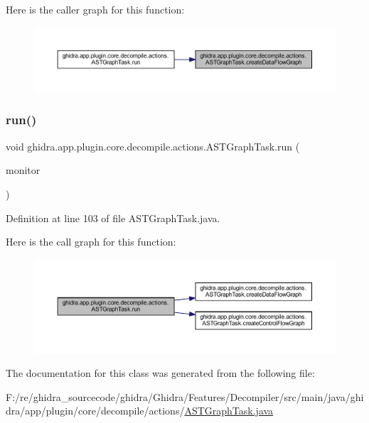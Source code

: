 Here is the caller graph for this function\+:
\nopagebreak
\begin{figure}[H]
\begin{center}
\leavevmode
\includegraphics[width=350pt]{classghidra_1_1app_1_1plugin_1_1core_1_1decompile_1_1actions_1_1_a_s_t_graph_task_a696b176035c13b47e77ed1371f3511f5_icgraph}
\end{center}
\end{figure}
\mbox{\label{classghidra_1_1app_1_1plugin_1_1core_1_1decompile_1_1actions_1_1_a_s_t_graph_task_afed12375602467d717a1d2afe52573ee}} 
\subsubsection{\texorpdfstring{run()}{run()}}
{\footnotesize\ttfamily void ghidra.\+app.\+plugin.\+core.\+decompile.\+actions.\+A\+S\+T\+Graph\+Task.\+run (\begin{DoxyParamCaption}\item[{Task\+Monitor}]{monitor }\end{DoxyParamCaption})\hspace{0.3cm}{\ttfamily [inline]}}



Definition at line 103 of file A\+S\+T\+Graph\+Task.\+java.

Here is the call graph for this function\+:
\nopagebreak
\begin{figure}[H]
\begin{center}
\leavevmode
\includegraphics[width=350pt]{classghidra_1_1app_1_1plugin_1_1core_1_1decompile_1_1actions_1_1_a_s_t_graph_task_afed12375602467d717a1d2afe52573ee_cgraph}
\end{center}
\end{figure}


The documentation for this class was generated from the following file\+:\begin{DoxyCompactItemize}
\item 
F\+:/re/ghidra\+\_\+sourcecode/ghidra/\+Ghidra/\+Features/\+Decompiler/src/main/java/ghidra/app/plugin/core/decompile/actions/\mbox{\hyperlink{_a_s_t_graph_task_8java}{A\+S\+T\+Graph\+Task.\+java}}\end{DoxyCompactItemize}

